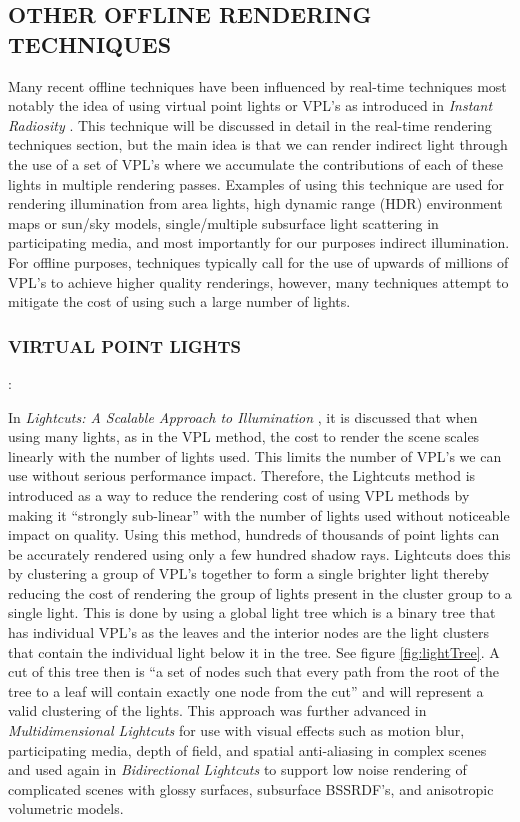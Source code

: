 \subsection{OTHER OFFLINE RENDERING TECHNIQUES} \label{sec:otheroffline}

Many recent offline techniques have been influenced by real-time techniques most notably the idea of using virtual point lights or VPL's as introduced in \textit{Instant Radiosity} \cite{Keller1997}.  This technique will be discussed in detail in the real-time rendering techniques section, but the main idea is that we can render indirect light through the use of a set of VPL's where we accumulate the contributions of each of these lights in multiple rendering passes.  Examples of using this technique are used for rendering illumination from area lights, high dynamic range (HDR) environment maps or sun/sky models, single/multiple subsurface light scattering in participating media, and most importantly for our purposes indirect illumination.  For offline purposes, techniques typically call for the use of upwards of millions of VPL's to achieve higher quality renderings, however, many techniques attempt to mitigate the cost of using such a large number of lights.

\subsubsection{VIRTUAL POINT LIGHTS}: 

In \textit{Lightcuts: A Scalable Approach to Illumination} \cite{Walter2005}, it is discussed that when using many lights, as in the VPL method, the cost to render the scene scales linearly with the number of lights used.  This limits the number of VPL's we can use without serious performance impact.  Therefore, the Lightcuts method is introduced as a way to reduce the rendering cost of using VPL methods by making it “strongly sub-linear” with the number of lights used without noticeable impact on quality.  Using this method, hundreds of thousands of point lights can be accurately rendered using only a few hundred shadow rays.  Lightcuts does this by clustering a group of VPL's together to form a single brighter light thereby reducing the cost of rendering the group of lights present in the cluster group to a single light.  This is done by using a global light tree which is a binary tree that has individual VPL's as the leaves and the interior nodes are the light clusters that contain the individual light below it in the tree.  See figure \ref{fig:lightTree}.  A cut of this tree then is ``a set of nodes such that every path from the root of the tree to a leaf will contain exactly one node from the cut'' and will represent a valid clustering of the lights.  This approach was further advanced in \textit{Multidimensional Lightcuts} \cite{Walter2006} for use with visual effects such as motion blur, participating media, depth of field, and spatial anti-aliasing in complex scenes and used again in \textit{Bidirectional Lightcuts} \cite{Walter2012} to support low noise rendering of complicated scenes with glossy surfaces, subsurface BSSRDF's, and anisotropic volumetric models.

